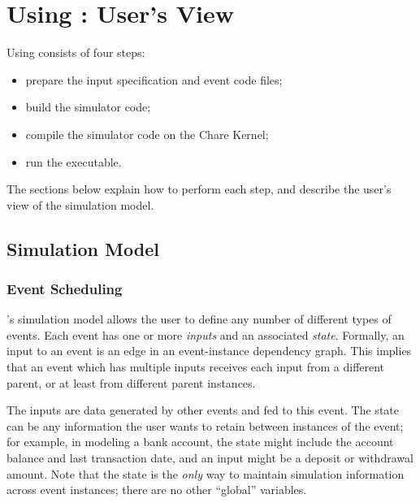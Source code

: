 \chapter{Using \dispare: User's View}
\label{input}

Using \dispare consists of four steps:
\begin{itemize}
\item prepare the input specification and event code files;
\item build the simulator code;
\item  compile the simulator code on the Chare Kernel;
\item  run the executable.
\end{itemize}
The sections below explain how to perform
each step, and describe the user's view of the \dispare simulation model.

\section{Simulation Model}

\subsection{Event Scheduling}

\dispare's simulation model allows the user to define any number of different
types of events.  Each event has one or more {\em inputs} and an
associated {\em state}.  Formally, an input to an event is an edge in an
event-instance dependency graph.  This implies that an event which has
multiple inputs receives each input from a different parent, or at least
from different parent instances.  

The inputs are data generated by other events and fed to this event.
The state can be any information the user wants to retain between
instances of the event; for example, in modeling a bank account, the
state might include the account balance and last transaction date, and
an input might be a deposit or withdrawal amount.  Note that the state
is the {\em only} way to maintain simulation information across event
instances; there are no other ``global'' variables.


